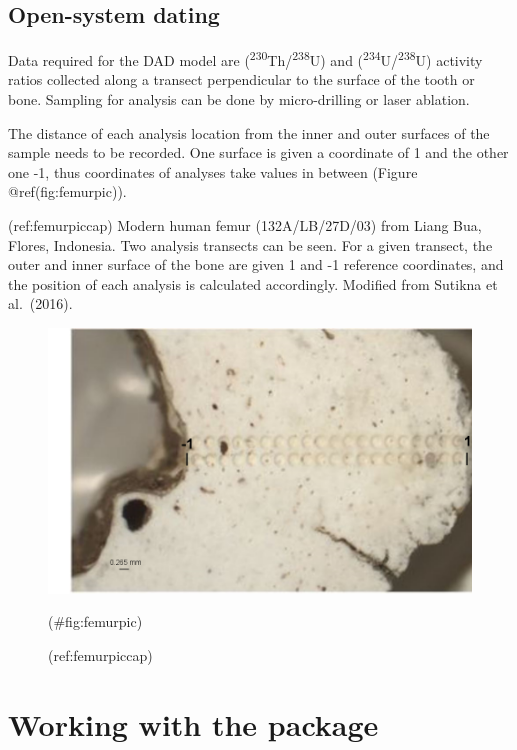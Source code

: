 \documentclass[]{elsarticle} %
\begin{document}
\hypertarget{open-system-dating}{%
\subsection{Open-system dating}\label{open-system-dating}}

Data required for the DAD model are (\textsuperscript{230}Th/\textsuperscript{238}U) and (\textsuperscript{234}U/\textsuperscript{238}U) activity ratios collected along a transect perpendicular to the surface of the tooth or bone. Sampling for analysis can be done by micro-drilling or laser ablation.

The distance of each analysis location from the inner and outer surfaces of the sample needs to be recorded. One surface is given a coordinate of 1 and the other one -1, thus coordinates of analyses take values in between (Figure @ref(fig:femurpic)).

(ref:femurpiccap) Modern human femur (132A/LB/27D/03) from Liang Bua, Flores, Indonesia. Two analysis transects can be seen. For a given transect, the outer and inner surface of the bone are given 1 and -1 reference coordinates, and the position of each analysis is calculated accordingly. Modified from Sutikna et al.~(2016).

\begin{figure}
\includegraphics[width=0.95\linewidth]{figures/bone} \caption{(ref:femurpiccap)}(\#fig:femurpic)
\end{figure}

\FloatBarrier

\hypertarget{working-with-the-package}{%
\section{Working with the package}\label{working-with-the-package}}
\end{document}
